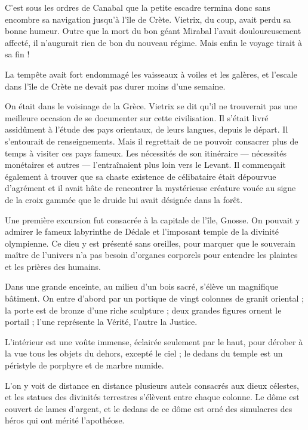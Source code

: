 \documentclass[a4paper, 11pt, oneside, polutonikogreek, french]{article}
\begin{document}
C'est sous les ordres de Canabal que la petite escadre termina donc sans encombre sa navigation jusqu'à l'île de Crète. Vietrix, du coup, avait perdu sa bonne humeur. Outre que la mort du bon géant Mirabal l'avait douloureusement affecté, il n'augurait rien de bon du nouveau régime. Mais enfin le voyage tirait à sa fin !

La tempête avait fort endommagé les vaisseaux à voiles et les galères, et l'escale dans l'île de Crète ne devait pas durer moins d'une semaine.

On était dans le voisinage de la Grèce. Vietrix se dit qu'il ne trouverait pas une meilleure occasion de se documenter sur cette civilisation. Il s'était livré assidûment à l'étude des pays orientaux, de leurs langues, depuis le départ. Il s'entourait de renseignements. Mais il regrettait de ne pouvoir consacrer plus de temps à visiter ces pays fameux. Les nécessités de son itinéraire --- nécessités monétaires et autres --- l'entraînaient plus loin vers le Levant. Il commençait également à trouver que sa chaste existence de célibataire était dépourvue d'agrément et il avait hâte de rencontrer la mystérieuse créature vouée au signe de la croix gammée que le druide lui avait désignée dans la forêt.

\bigskip
\centerline{\EightStarTaper}
\centerline{\EightStarTaper\EightStarTaper}
\bigskip

Une première excursion fut consacrée à la capitale de l'île, Gnosse. On pouvait y admirer le fameux labyrinthe de Dédale et l'imposant temple de la divinité olympienne. Ce dieu y est présenté sans oreilles, pour marquer que le souverain maître de l'univers n'a pas besoin d'organes corporels pour entendre les plaintes et les prières des humains.

Dans une grande enceinte, au milieu d'un bois sacré, s'élève un magnifique bâtiment. On entre d'abord par un portique de vingt colonnes de granit oriental ; la porte est de bronze d'une riche sculpture ; deux grandes figures ornent le portail ; l'une représente la Vérité, l'autre la Justice.

L'intérieur est une voûte immense, éclairée seulement par le haut, pour dérober à la vue tous les objets du dehors, excepté le ciel ; le dedans du temple est un péristyle de porphyre et de marbre numide.

L'on y voit de distance en distance plusieurs autels consacrés aux dieux célestes, et les statues des divinités terrestres s'élèvent entre chaque colonne. Le dôme est couvert de lames d'argent, et le dedans de ce dôme est orné des simulacres des héros qui ont mérité l'apothéose.
\end{document}
